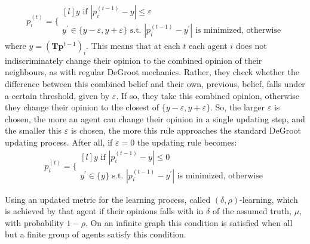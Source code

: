 \documentclass{article}
\newcommand{\beli}[3][2]{p_{#2}^{(#3)}}
\begin{document}
\begin{equation}
    \label{edegroot:updating}
  \beli{i}{t} =\Bigg\{
  \begin{matrix*}[l]
  y \text{ if } |\beli{i}{t-1} - y| \leq \varepsilon\\
  y^{\prime}\in\{y-\varepsilon, y+\varepsilon\}\text{ s.t. }|\beli{i}{t-1} - y^{\prime}|\text{ is minimized, otherwise}
  \end{matrix*}
\end{equation}
where $y = (\textbf{T}\textbf{p}^{t-1})_i$. This means that at each $t$ each agent $i$ does not indiscriminately change their opinion to the combined opinion of their neighbours, as with regular DeGroot mechanics. Rather, they check whether the difference between this combined belief and their own, previous, belief, falls under a certain threshold, given by $\varepsilon$. If so, they take this combined opinion, otherwise they change their opinion to the closest of $\{y-\varepsilon, y+\varepsilon\}$. So, the larger $\varepsilon$ is chosen, the more an agent can change their opinion in a single updating step, and the smaller this $\varepsilon$ is chosen, the more this rule approaches the standard DeGroot updating process. After all, if $\varepsilon = 0$ the updating rule becomes:
\begin{equation*}
  \beli{i}{t} =\Bigg\{
  \begin{matrix*}[l]
  y \text{ if } |\beli{i}{t-1} - y| \leq 0\\
  y^{\prime}\in\{y\}\text{ s.t. }|\beli{i}{t-1} - y^{\prime}|\text{ is minimized, otherwise}
  \end{matrix*}
\end{equation*}

Using an updated metric for the learning process, called $(\delta, \rho)$-learning, which is achieved by that agent if their opinions falls with in $\delta$ of the assumed truth, $\mu$, with probability $1 - \rho$. On an infinite graph this condition is satisfied when all but a finite group of agents satisfy this condition. \newline
\end{document}
